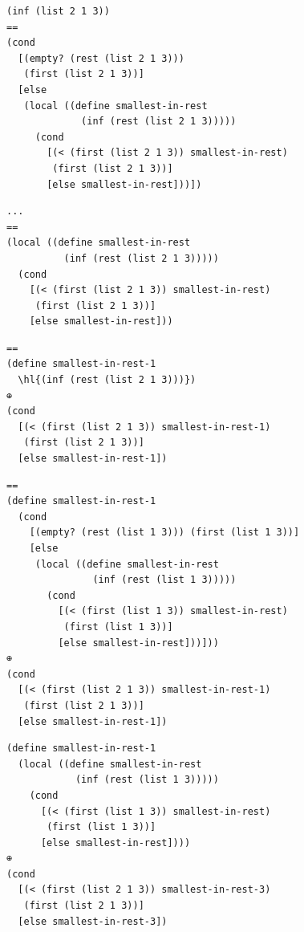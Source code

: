 \begin{stepperbox}
\begin{Verbatim}[commandchars=\\\{\}, fontsize=\footnotesize]
(inf (list 2 1 3))
==
(cond
  [(empty? (rest (list 2 1 3)))
   (first (list 2 1 3))]
  [else
   (local ((define smallest-in-rest
             (inf (rest (list 2 1 3)))))
     (cond
       [(< (first (list 2 1 3)) smallest-in-rest)
        (first (list 2 1 3))]
       [else smallest-in-rest]))])
\end{Verbatim}
\end{stepperbox}

\begin{stepperbox}
\begin{Verbatim}[commandchars=\\\{\}, fontsize=\footnotesize]
...
==
(local ((define smallest-in-rest
          (inf (rest (list 2 1 3)))))
  (cond
    [(< (first (list 2 1 3)) smallest-in-rest)
     (first (list 2 1 3))]
    [else smallest-in-rest]))
\end{Verbatim}
\end{stepperbox}

\begin{stepperbox}
\begin{Verbatim}[commandchars=\\\{\}, fontsize=\footnotesize]
==
(define smallest-in-rest-1
  \hl{(inf (rest (list 2 1 3)))})
⊕
(cond
  [(< (first (list 2 1 3)) smallest-in-rest-1)
   (first (list 2 1 3))]
  [else smallest-in-rest-1])
\end{Verbatim}
\end{stepperbox}

\begin{stepperbox}
\begin{Verbatim}[commandchars=\\\{\}, fontsize=\footnotesize]
==
(define smallest-in-rest-1
  (cond
    [(empty? (rest (list 1 3))) (first (list 1 3))]
    [else
     (local ((define smallest-in-rest
               (inf (rest (list 1 3)))))
       (cond
         [(< (first (list 1 3)) smallest-in-rest)
          (first (list 1 3))]
         [else smallest-in-rest]))]))
⊕
(cond
  [(< (first (list 2 1 3)) smallest-in-rest-1)
   (first (list 2 1 3))]
  [else smallest-in-rest-1])
\end{Verbatim}
\end{stepperbox}

\begin{stepperbox}
\begin{Verbatim}[commandchars=\\\{\}, fontsize=\footnotesize]
(define smallest-in-rest-1
  (local ((define smallest-in-rest
            (inf (rest (list 1 3)))))
    (cond
      [(< (first (list 1 3)) smallest-in-rest)
       (first (list 1 3))]
      [else smallest-in-rest])))
⊕
(cond
  [(< (first (list 2 1 3)) smallest-in-rest-3)
   (first (list 2 1 3))]
  [else smallest-in-rest-3])
\end{Verbatim}
\end{stepperbox}

